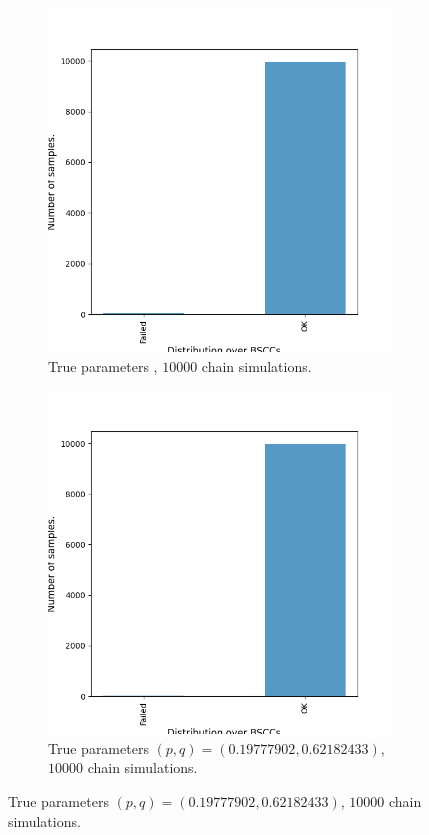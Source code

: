 \begin{figure}[H]
    \centering
    \begin{subfigure}{0.48\textwidth}
        \centering
        \includegraphics[width=\linewidth]{figures/zeroconf4_data.png}
        \caption{True parameters , $10000$ chain simulations.}
    \end{subfigure}
    \hfill
    \begin{subfigure}{0.48\textwidth}
        \centering
        \includegraphics[width=\linewidth]{figures/zeroconf10_data.png}
        \caption{True parameters $(p,q)=(0.19777902, 0.62182433)$, $10000$ chain simulations.}
    \end{subfigure}
\end{figure}


